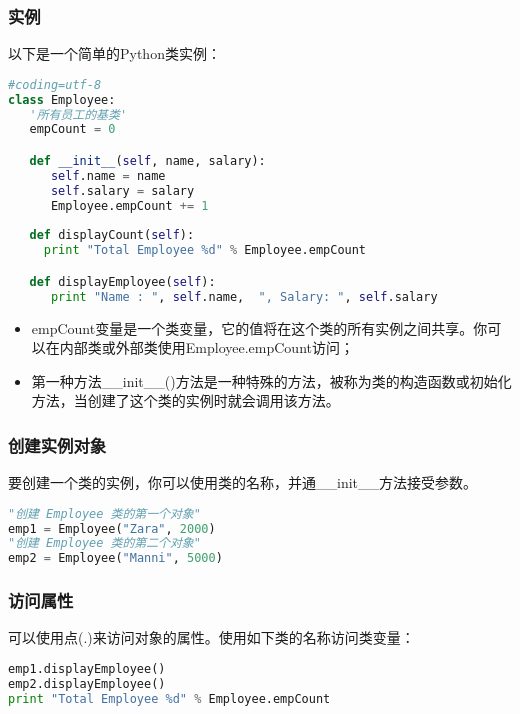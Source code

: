 \subsubsection{实例}
以下是一个简单的Python类实例：
\begin{lstlisting}[language=Python]
#coding=utf-8
class Employee:
   '所有员工的基类'
   empCount = 0

   def __init__(self, name, salary):
      self.name = name
      self.salary = salary
      Employee.empCount += 1
   
   def displayCount(self):
     print "Total Employee %d" % Employee.empCount

   def displayEmployee(self):
      print "Name : ", self.name,  ", Salary: ", self.salary
\end{lstlisting}
\begin{itemize}
\item empCount变量是一个类变量，它的值将在这个类的所有实例之间共享。你可以在内部类或外部类使用Employee.empCount访问；

\item 第一种方法\_\_init\_\_()方法是一种特殊的方法，被称为类的构造函数或初始化方法，当创建了这个类的实例时就会调用该方法。
\end{itemize}



\subsubsection{创建实例对象}
要创建一个类的实例，你可以使用类的名称，并通\_\_init\_\_方法接受参数。
\begin{lstlisting}[language=Python]
"创建 Employee 类的第一个对象"
emp1 = Employee("Zara", 2000)
"创建 Employee 类的第二个对象"
emp2 = Employee("Manni", 5000)
\end{lstlisting}



\subsubsection{访问属性}
可以使用点(.)来访问对象的属性。使用如下类的名称访问类变量：
\begin{lstlisting}[language=Python]
emp1.displayEmployee()
emp2.displayEmployee()
print "Total Employee %d" % Employee.empCount
\end{lstlisting}



